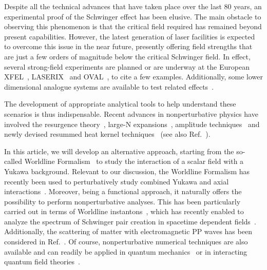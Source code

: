 \documentclass[12pt,a4paper]{article}
\numberwithin{equation}{section}
\numberwithin{equation}{section}
\begin{document}
Despite all the technical advances that have taken place over the last 80 years, an experimental proof of the Schwinger effect has been elusive. The main obstacle to observing this phenomenon is that the critical field required has remained beyond present capabilities. However, the latest generation of laser facilities is expected to overcome this issue in the near future, presently offering field strengths that are just a few orders of magnitude below the critical Schwinger field. In effect, several strong-field experiments are planned or are underway at the European XFEL~\cite{Ahmadiniaz:2024xob, LUXE:2023crk}, LASERIX~\cite{Kraych:2024wwd} and OVAL~\cite{Fan:2017fnd}, to cite a few examples. Additionally, some lower dimensional analogue systems are available to test related effects~\cite{Schmitt:2022pkd}.

The development of appropriate analytical tools to help understand these scenarios is thus indispensable. Recent advances in nonperturbative physics have involved the resurgence theory~\cite{Dunne:2022esi}, large-N expansions~\cite{Karbstein:2023yee, Karbstein:2021gdi}, amplitude techniques~\cite{Copinger:2024pai} and newly devised resummed heat kernel techniques~\cite{Franchino-Vinas:2023wea} (see also Ref.~\cite{Navarro-Salas:2020oew}). 
 
In this article, we will develop an alternative approach, starting from the so-called Worldline Formalism~\cite{Schubert:2001he} to study the interaction of a scalar field with a Yukawa background. 
Relevant to our discussion, the Worldline Formalism has recently been used to perturbatively study combined Yukawa and axial interactions~\cite{Bastianelli:2024vkp}. Moreover, being a functional approach, it naturally offers the possibility to perform nonperturbative analyses. This has been particularly carried out in terms of Worldline instantons~\cite{Dunne:2006st}, which has recently enabled to analyze the spectrum of Schwinger pair creation in spacetime dependent fields~\cite{DegliEsposti:2024upq}. Additionally, the scattering of matter with electromagnetic PP waves has been considered in Ref.~\cite{Copinger:2024twl}. Of course, nonperturbative numerical techniques are also available and can readily be applied in quantum mechanics~\cite{Ahumada:2023iac} or in interacting quantum field theories~\cite{Franchino-Vinas:2019udt}.
\end{document}
